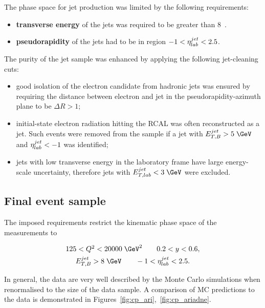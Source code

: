 The phase space for jet production was limited by the following requirements:
\begin{itemize}
	\item \textbf{transverse energy} of the jets was required to be greater than 8~\GeV.
	\item \textbf{pseudorapidity} of the jets had to be in region $-1<\mbox{$\eta^{jet}_{lab}$}<2.5$.
\end{itemize}
The purity of the jet sample was enhanced by applying the following jet-cleaning cuts:

\begin{itemize}
	\item good isolation of the electron candidate from hadronic jets was ensured by requiring the distance between electron and jet in the pseudorapidity-azimuth plane to be $\Delta R > 1$;
	\item initial-state electron radiation hitting the RCAL was often reconstructed as a jet. Such events were removed from the sample if a jet with $\etjetb > 5\;\GeV$ and $\mbox{$\eta^{jet}_{lab}$} < -1$ was identified;
	\item jets with low transverse energy in the laboratory frame have large energy-scale uncertainty, therefore jets with $\etjetlab < 3\;\GeV$ were excluded.
\end{itemize}

\subsection{Final event sample}
\label{subsec:eventsampletab}
The imposed requirements restrict the kinematic phase space of the measurements to

\begin{gather}
125 < \qsq < 20000\;\GeV^2 \qquad 0.2 < y < 0.6, \\
\etjetb > 8\;\GeV \qquad -1 < \etajetlab < 2.5.
\end{gather}

In general, the data are very well described by the Monte Carlo simulations when renormalised to the size of the data sample. A comparison of MC predictions to the data is demonstrated in Figures~\ref{fig:cp_ari},~\ref{fig:cp_ariadne}. 


